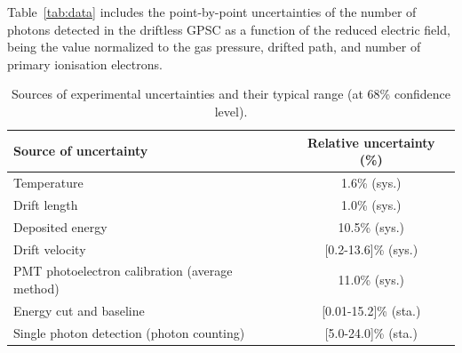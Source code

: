 \documentclass[%
 reprint,
superscriptaddress,
 amsmath,amssymb,
 aps,
]{revtex4-2}
\begin{document}
Table~\ref{tab:data} includes the point-by-point uncertainties of the number of photons detected in the driftless GPSC as a function of the reduced electric field, being the value normalized to the gas pressure, drifted path, and number of primary ionisation electrons. 

\begin{table}[t!]
\centering
\begin{tabular}{l c}
\hline \hline
Source of uncertainty & Relative uncertainty (\%) \\
\hline
Temperature & 1.6\% (sys.)\\
Drift length & 1.0\% (sys.)\\
Deposited energy & 10.5\% (sys.)\\
Drift velocity & [0.2-13.6]\% (sys.)\\
PMT photoelectron calibration (average method) & 11.0\% (sys.)\\
Energy cut and baseline & [0.01-15.2]\% (sta.)\\
Single photon detection (photon counting) & [5.0-24.0]\% (sta.)\\
\hline
\end{tabular}
\caption{\label{tab:sources} Sources of experimental uncertainties and their typical range (at 68\% confidence level).}
\end{table}
\end{document}
